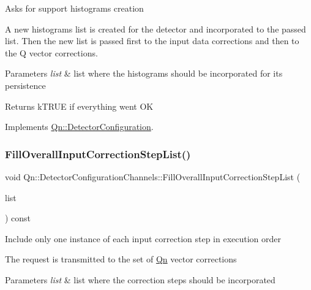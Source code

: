 Asks for support histograms creation

A new histograms list is created for the detector and incorporated to the passed list. Then the new list is passed first to the input data corrections and then to the Q vector corrections. 
\begin{DoxyParams}{Parameters}
{\em list} & list where the histograms should be incorporated for its persistence \\
\hline
\end{DoxyParams}
\begin{DoxyReturn}{Returns}
k\+T\+R\+UE if everything went OK 
\end{DoxyReturn}


Implements \mbox{\hyperlink{classQn_1_1DetectorConfiguration_a8e5e2eef94bca58a3dcf34fe5fbd1429}{Qn\+::\+Detector\+Configuration}}.

\mbox{\label{classQn_1_1DetectorConfigurationChannels_aa9e99a908719d0de616cebf9329fe83f}} 
\subsubsection{\texorpdfstring{Fill\+Overall\+Input\+Correction\+Step\+List()}{FillOverallInputCorrectionStepList()}}
{\footnotesize\ttfamily void Qn\+::\+Detector\+Configuration\+Channels\+::\+Fill\+Overall\+Input\+Correction\+Step\+List (\begin{DoxyParamCaption}\item[{T\+List $\ast$}]{list }\end{DoxyParamCaption}) const\hspace{0.3cm}{\ttfamily [virtual]}}

Include only one instance of each input correction step in execution order

The request is transmitted to the set of \mbox{\hyperlink{namespaceQn}{Qn}} vector corrections 
\begin{DoxyParams}{Parameters}
{\em list} & list where the correction steps should be incorporated \\
\hline
\end{DoxyParams}


